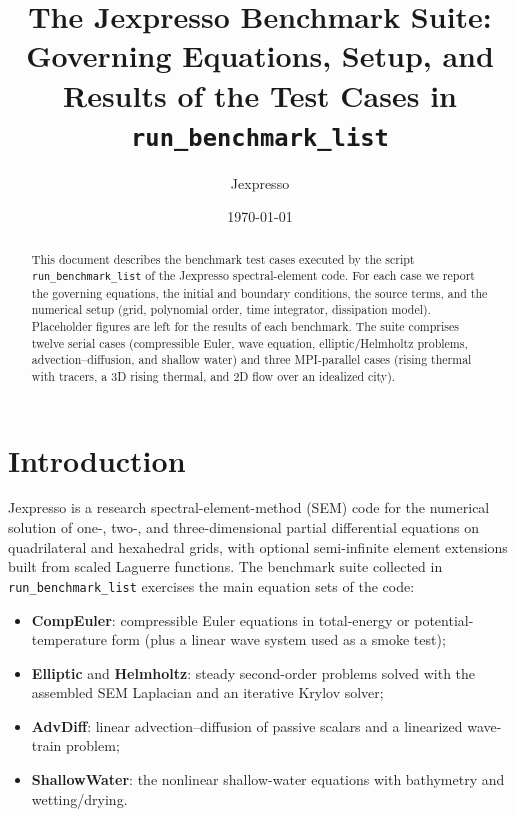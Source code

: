 \documentclass[11pt,a4paper]{article}
\title{The Jexpresso Benchmark Suite:\\
       Governing Equations, Setup, and Results of the Test Cases in
       \texttt{run\_benchmark\_list}}
\author{Jexpresso}
\date{\today}
\begin{document}
\maketitle

\begin{abstract}
This document describes the benchmark test cases executed by the script
\texttt{run\_benchmark\_list} of the Jexpresso spectral-element code.
For each case we report the governing equations, the initial and boundary
conditions, the source terms, and the numerical setup (grid, polynomial
order, time integrator, dissipation model). Placeholder figures are left
for the results of each benchmark. The suite comprises twelve serial cases
(compressible Euler, wave equation, elliptic/Helmholtz problems,
advection--diffusion, and shallow water) and three MPI-parallel cases
(rising thermal with tracers, a 3D rising thermal, and 2D flow over an
idealized city).
\end{abstract}

\tableofcontents
\clearpage

\section{Introduction}
Jexpresso is a research spectral-element-method (SEM) code for the
numerical solution of one-, two-, and three-dimensional partial
differential equations on quadrilateral and hexahedral grids, with
optional semi-infinite element extensions built from scaled Laguerre
functions. The benchmark suite collected in \texttt{run\_benchmark\_list}
exercises the main equation sets of the code:

\begin{itemize}
  \item \textbf{CompEuler}: compressible Euler equations in total-energy
        or potential-temperature form (plus a linear wave system used as
        a smoke test);
  \item \textbf{Elliptic} and \textbf{Helmholtz}: steady second-order
        problems solved with the assembled SEM Laplacian and an iterative
        Krylov solver;
  \item \textbf{AdvDiff}: linear advection--diffusion of passive scalars
        and a linearized wave-train problem;
  \item \textbf{ShallowWater}: the nonlinear shallow-water equations with
        bathymetry and wetting/drying.
\end{itemize}
\end{document}
